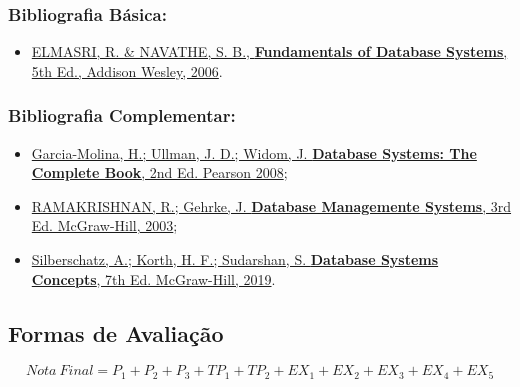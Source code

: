 \documentclass[12pt, a4paper]{article}
\begin{document}

\subsubsection*{Bibliografia Básica:} \label{subsubsec:bibliografiabasica}

\begin{itemize}\setlength{\itemsep}{0pt}
    \item \href{https://people.inf.elte.hu/kiss/DB/fundamentals-of-database-systems.pdf}{ELMASRI, R. \& NAVATHE, S. B., \textbf{Fundamentals of Database Systems}, 5th Ed., Addison Wesley, 2006}.
\end{itemize}

\subsubsection*{Bibliografia Complementar:} \label{subsubsec:bibliografiacomplementar}

\begin{itemize}\setlength{\itemsep}{0pt}
    \item \href{https://people.inf.elte.hu/kiss/DB/ullman_the_complete_book.pdf}{Garcia-Molina, H.; Ullman, J. D.; Widom, J. \textbf{Database Systems: The Complete Book}, 2nd Ed. Pearson 2008};
    \item \href{https://github.com/pforpallav/school/blob/master/CPSC404/Ramakrishnan%20-%20Database%20Management%20Systems%203rd%20Edition.pdf}{RAMAKRISHNAN, R.; Gehrke, J. \textbf{Database Managemente Systems}, 3rd Ed. McGraw-Hill, 2003};
    \item \href{https://people.vts.su.ac.rs/~peti/Baze%20podataka/Literatura/Silberschatz-Database%20System%20Concepts%206th%20ed.pdf}{Silberschatz, A.; Korth, H. F.; Sudarshan, S. \textbf{Database Systems Concepts}, 7th Ed. McGraw-Hill, 2019}.
\end{itemize}

\subsection{Formas de Avaliação} \label{subsec:avaliacoes}

$$Nota\ Final = P_1 + P_2 + P_3 + TP_1 + TP_2 + EX_1 + EX_2 + EX_3 + EX_4 + EX_5$$
\end{document}

